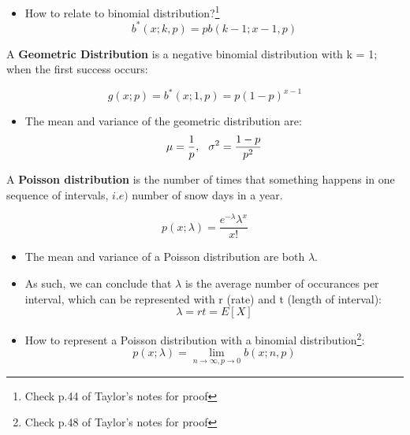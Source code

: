 \documentclass[10pt, letterpaper, twoside]{article}
\begin{document}
\begin{multicols}{2}
\begin{itemize}
    \item How to relate to binomial distribution?\footnote[1]{Check p.44 of Taylor's notes for proof}
    \begin{equation*}
        b^{*}(x;k,p) = pb(k-1;x-1,p)
    \end{equation*}
\end{itemize}

A \textbf{Geometric Distribution} is a negative binomial distribution with k = 1; when the first success occurs:

\begin{equation*}
    g(x;p) = b^{*}(x;1,p) = p(1-p)^{x-1}
\end{equation*}

\begin{itemize}
    \item The mean and variance of the geometric distribution are:
    \begin{equation*}
        \mu = \frac{1}{p},\hspace{0.25cm} \sigma^2 = \frac{1-p}{p^2}
    \end{equation*}
\end{itemize}

A \textbf{Poisson distribution} is the number of times that something happens in one sequence of intervals, $i.e)$ number of snow days in a year.

\begin{equation*}
    p(x;\lambda) = \frac{e^{-\lambda}\lambda^x}{x!}
\end{equation*}

\begin{itemize}
    \item The mean and variance of a Poisson distribution are both $\lambda$.
    \item As such, we can conclude that $\lambda$ is the average number of occurances per interval, which can be represented with r (rate) and t (length of interval):
    \begin{equation*}
        \lambda = rt = E[X]
    \end{equation*}
    \item How to represent a Poisson distribution with a binomial distribution\footnote[2]{Check p.48 of Taylor's notes for proof}:
    \begin{equation*}
        p(x;\lambda) = \lim_{n\rightarrow\infty,p\rightarrow 0}b(x;n,p)
    \end{equation*}
\end{itemize}


\end{multicols}
\end{document}
